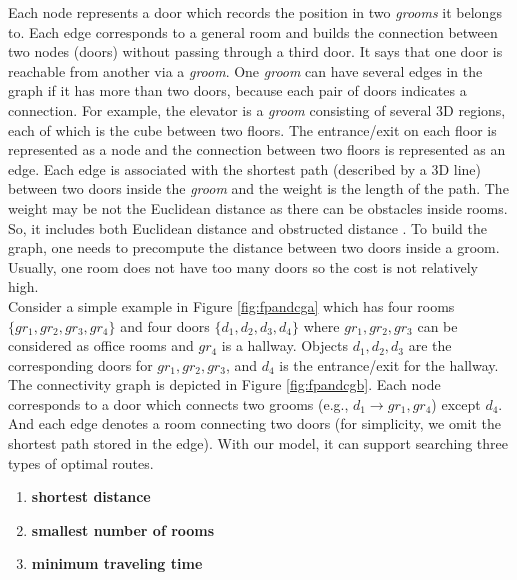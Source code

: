 Each node represents a door which records the position in two \textit{grooms} it belongs to. Each
edge corresponds to a general room and builds the connection between two nodes 
(doors) without passing through a third door. 
It says that one door is reachable from another via a \textit{groom}. One \textit{groom} can have several edges in the graph if it has more than two doors, because each pair of doors indicates a connection. 
For example, the elevator is a \textit{groom} consisting of several 3D regions, each of which is the cube between two floors. The entrance/exit on each floor is represented as a node and the connection 
between two floors is represented as an edge. 
Each edge is associated with the shortest path (described by a 3D line) between two doors 
inside the \textit{groom} and the weight is the length of the path. The weight may be not the
Euclidean distance as there can be obstacles inside rooms. So, it includes both 
Euclidean distance and obstructed distance \cite{ZPMZ04,YLJ10}. To build the graph, one needs to precompute the distance between two doors inside a groom. Usually, one room does not have too many doors so the cost is not relatively high. \\

Consider a simple example in Figure \ref{fig:fpandcga} which has four rooms $\{gr_1,gr_2,gr_3,gr_4\}$ and four doors 
$\{d_1,d_2,d_3,d_4\}$ where $gr_1,gr_2,gr_3$ can be considered as office rooms and $gr_4$
is a hallway. Objects $d_1,d_2,d_3$ are the corresponding doors for $gr_1,gr_2,gr_3$, and
$d_4$ is the entrance/exit for the hallway. The connectivity graph is depicted in Figure
\ref{fig:fpandcgb}. Each node corresponds to a door which connects two grooms (e.g., $d_1\rightarrow gr_1,gr_4$) except $d_4$. And each edge denotes a room connecting two doors (for simplicity, we omit the shortest path stored in the edge). With our model, it can support searching three types of optimal routes. 
\begin{enumerate}
 \item \textbf{shortest distance}
 \item \textbf{smallest number of rooms}
 \item \textbf{minimum traveling time} \\
\end{enumerate}

